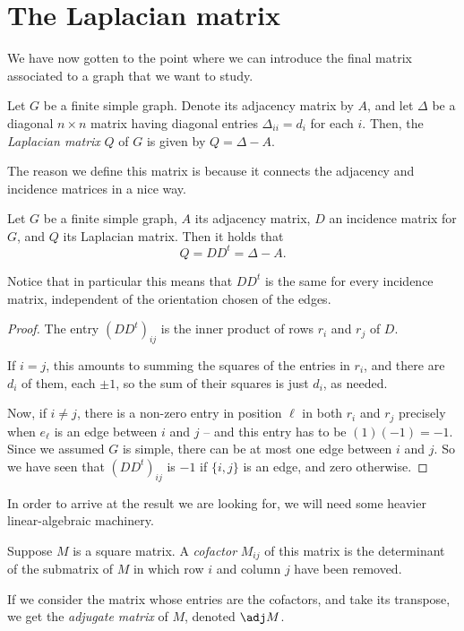 \documentclass[nobib]{tufte-handout}
\begin{document}
\section{The Laplacian matrix}

We have now gotten to the point where we can introduce the final matrix associated to a graph that we want to study.

\begin{definition}
    Let $G$ be a finite simple graph. Denote its adjacency matrix by $A$, and let $\Delta$ be a diagonal $n\times n$ matrix having diagonal entries $\Delta_{ii} = d_i$ for each $i$. Then, the \emph{Laplacian matrix} $Q$ of $G$ is given by
    $Q = \Delta - A.$
\end{definition}

The reason we define this matrix is because it connects the adjacency and incidence matrices in a nice way.

\begin{theorem}
    Let $G$ be a finite simple graph, $A$ its adjacency matrix, $D$ an incidence matrix for $G$, and $Q$ its Laplacian matrix. Then it holds that
    $$Q = DD^t = \Delta - A.$$

    Notice that in particular this means that $DD^t$ is the same for every incidence matrix, independent of the orientation chosen of the edges.

    \begin{proof}
        The entry $(DD^t)_{ij}$ is the inner product of rows $r_i$ and $r_j$ of $D$.

        If $i = j$, this amounts to summing the squares of the entries in $r_i$, and there are $d_i$ of them, each $\pm 1$, so the sum of their squares is just $d_i$, as needed.
        
        Now, if $i \neq j$, there is a non-zero entry in position $\ell$ in both $r_i$ and $r_j$ precisely when $e_\ell$ is an edge between $i$ and $j$ -- and this entry has to be $(1)(-1) = -1$. Since we assumed $G$ is simple, there can be at most one edge between $i$ and $j$. So we have seen that $(DD^t)_{ij}$ is $-1$ if $\{i,j\}$ is an edge, and zero otherwise.
    \end{proof}
\end{theorem}

In order to arrive at the result we are looking for, we will need some heavier linear-algebraic machinery.

\begin{definition}
    Suppose $M$ is a square matrix. A \emph{cofactor} $M_{ij}$ of this matrix is the determinant of the submatrix of $M$ in which row $i$ and column $j$ have been removed.

    If we consider the matrix whose entries are the cofactors, and take its transpose, we get the \emph{adjugate matrix} of $M$, denoted $\adj M$.
\end{definition}
\end{document}
